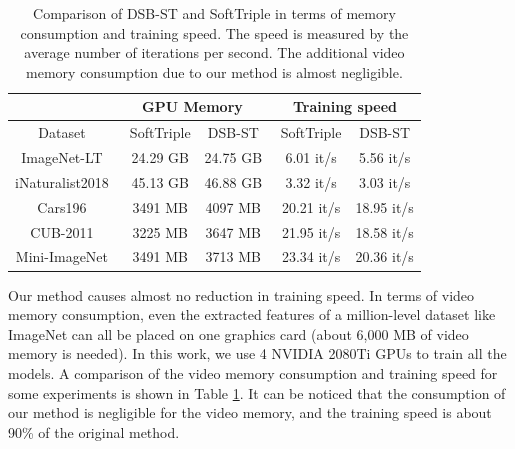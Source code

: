 \documentclass[10pt]{article} %
\begin{document}
\begin{table}[h]
\renewcommand\arraystretch{1.3}
\setlength{\tabcolsep}{22pt} %
\caption{Comparison of DSB-ST and SoftTriple in terms of memory consumption and training speed. The speed is measured by the average number of iterations per second. The additional video memory consumption due to our method is almost negligible.}
\label{table10}
\vskip 0.1in
\centering   
\begin{tabular}{ c | c c| c c}
\hline \toprule 
\multicolumn{1}{c}{ }  &   \multicolumn{2}{|c|}{GPU Memory}  &   \multicolumn{2}{c}{Training speed} \\ \hline
\multicolumn{1}{c|}{Dataset} &   \,\,\,SoftTriple  & DSB-ST  &  \,\,SoftTriple  & DSB-ST \\ \toprule
\multicolumn{1}{c|}{ImageNet-LT}  &  \,\,\,24.29 GB  &  24.75 GB  & \,\,6.01 it/s  & 5.56 it/s \\ \hline
\multicolumn{1}{c|}{iNaturalist2018}  &  \,\,\,45.13 GB  &  46.88 GB  & \,\,3.32 it/s  & 3.03 it/s \\ \hline
\multicolumn{1}{c|}{Cars196}  &  \,\,\,3491 MB  &  4097 MB  & \,\,20.21 it/s  & 18.95 it/s \\ \hline
\multicolumn{1}{c|}{CUB-2011}  &  \,\,\,3225 MB  &  3647 MB  & \,\,21.95 it/s  & 18.58 it/s \\ \hline
\multicolumn{1}{c|}{Mini-ImageNet}  &  \,\,\,3491 MB  &  3713 MB  & \,\,23.34 it/s  & 20.36 it/s \\
 \bottomrule \hline
\end{tabular}
\vskip -0.1in
\end{table}

Our method causes almost no reduction in training speed. In terms of video memory consumption, even the extracted features of a million-level dataset like ImageNet can all be placed on one graphics card (about 6,000 MB of video memory is needed). In this work, we use 4 NVIDIA 2080Ti GPUs to train all the models. A comparison of the video memory consumption and training speed for some experiments is shown in Table \ref{table10}. It can be noticed that the consumption of our method is negligible for the video memory, and the training speed is about 90\% of the original method.
\end{document}
